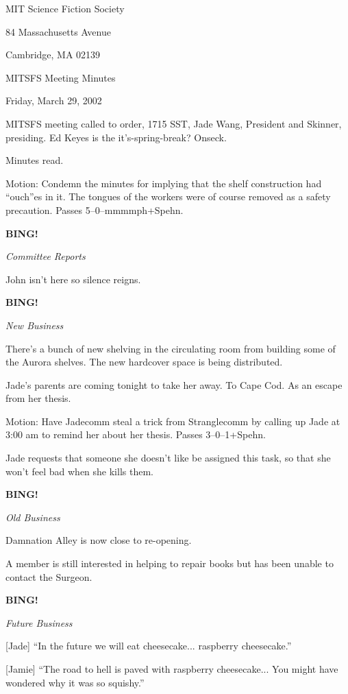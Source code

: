 \documentclass[12pt]{article}
\newcommand{\bing}{{\bf BING!} }
\newcommand{\goto}[1]{\bing \vskip 12pt \centerline{{\em{#1}}}}
\begin{document}
\begin{center}

MIT Science Fiction Society 

84 Massachusetts Avenue

Cambridge, MA 02139

\vspace{12pt}

MITSFS Meeting Minutes 

Friday, March 29, 2002

\end{center}
 
\vspace{18pt}

\setlength{\parskip}{6pt}

\noindent
MITSFS meeting called to order, 1715 SST, Jade Wang, President and
Skinner, presiding.  Ed Keyes is the it's-spring-break? Onseck.

Minutes read.

Motion: Condemn the minutes for implying that the shelf construction
had ``ouch''es in it.  The tongues of the workers were of course
removed as a safety precaution.  Passes 5--0--mmmmph+Spehn.

\goto{Committee Reports}

John isn't here so silence reigns.

\goto{New Business}

There's a bunch of new shelving in the circulating room from building
some of the Aurora shelves.  The new hardcover space is being
distributed.

Jade's parents are coming tonight to take her away.  To Cape Cod.
As an escape from her thesis.

Motion: Have Jadecomm steal a trick from Stranglecomm by calling up
Jade at 3:00 am to remind her about her thesis.  Passes 3--0--1+Spehn.

Jade requests that someone she doesn't like be assigned this task,
so that she won't feel bad when she kills them.

\goto{Old Business}

Damnation Alley is now close to re-opening.

A member is still interested in helping to repair books but has
been unable to contact the Surgeon.

\goto{Future Business}

[Jade] ``In the future we will eat cheesecake... raspberry
cheesecake.''

[Jamie] ``The road to hell is paved with raspberry cheesecake...  You
might have wondered why it was so squishy.''
\end{document}
